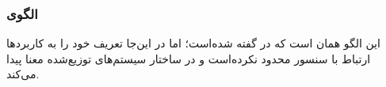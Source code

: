 \subsubsection{الگوی }
\label{distrObserverSec}
\begin{RTL}
این الگو همان  است که در
\cite{ref1} گفته شده‌است؛ اما در این‌جا تعریف خود را به کاربردها
ارتباط با سنسور محدود نکرده‌است و در ساختار سیستم‌های توزیع‌شده معنا پیدا می‌کند.
\end{RTL}